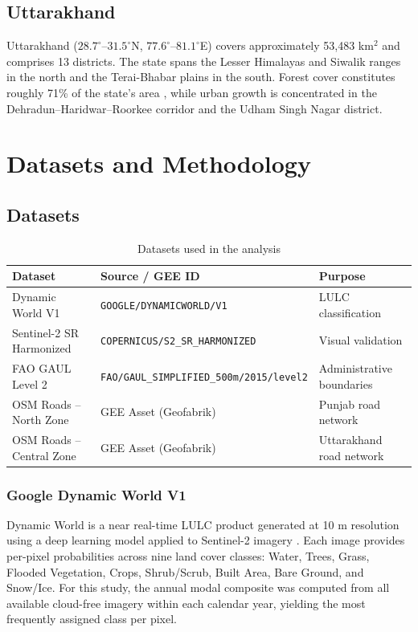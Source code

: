 \documentclass[12pt,a4paper]{article}
\begin{document}
\subsection{Uttarakhand}
Uttarakhand ($28.7^{\circ}$--$31.5^{\circ}$N, $77.6^{\circ}$--$81.1^{\circ}$E) covers approximately 53,483 km$^2$ and comprises 13 districts. The state spans the Lesser Himalayas and Siwalik ranges in the north and the Terai-Bhabar plains in the south. Forest cover constitutes roughly 71\% of the state's area \citep{fsi2021}, while urban growth is concentrated in the Dehradun--Haridwar--Roorkee corridor and the Udham Singh Nagar district.

\section{Datasets and Methodology}

\subsection{Datasets}

\begin{table}[H]
\centering
\caption{Datasets used in the analysis}
\label{tab:datasets}
\begin{tabular}{lll}
\toprule
\textbf{Dataset} & \textbf{Source / GEE ID} & \textbf{Purpose} \\
\midrule
Dynamic World V1 & \texttt{GOOGLE/DYNAMICWORLD/V1} & LULC classification \\
Sentinel-2 SR Harmonized & \texttt{COPERNICUS/S2\_SR\_HARMONIZED} & Visual validation \\
FAO GAUL Level 2 & \texttt{FAO/GAUL\_SIMPLIFIED\_500m/2015/level2} & Administrative boundaries \\
OSM Roads -- North Zone & GEE Asset (Geofabrik) & Punjab road network \\
OSM Roads -- Central Zone & GEE Asset (Geofabrik) & Uttarakhand road network \\
\bottomrule
\end{tabular}
\end{table}

\subsubsection{Google Dynamic World V1}
Dynamic World is a near real-time LULC product generated at 10 m resolution using a deep learning model applied to Sentinel-2 imagery \citep{brown2022dynamic}. Each image provides per-pixel probabilities across nine land cover classes: Water, Trees, Grass, Flooded Vegetation, Crops, Shrub/Scrub, Built Area, Bare Ground, and Snow/Ice. For this study, the annual modal composite was computed from all available cloud-free imagery within each calendar year, yielding the most frequently assigned class per pixel.
\end{document}
